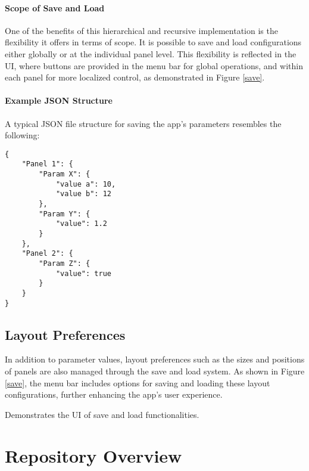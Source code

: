 \paragraph{Scope of Save and Load}
One of the benefits of this hierarchical and recursive implementation is the flexibility it offers in terms of scope. It is possible to save and load configurations either globally or at the individual panel level. This flexibility is reflected in the UI, where buttons are provided in the menu bar for global operations, and within each panel for more localized control, as demonstrated in Figure \ref{save}.

\paragraph{Example JSON Structure}
A typical JSON file structure for saving the app's parameters resembles the following:

\begin{verbatim}
{
    "Panel 1": {
        "Param X": {
            "value a": 10,
            "value b": 12
        },
        "Param Y": {
            "value": 1.2
        }
    },
    "Panel 2": {
        "Param Z": {
            "value": true
        }
    }
}
\end{verbatim}


\subsection{Layout Preferences}

In addition to parameter values, layout preferences such as the sizes and positions of panels are also managed through the save and load system. As shown in Figure \ref{save}, the menu bar includes options for saving and loading these layout configurations, further enhancing the app’s user experience.

{Demonstrates the UI of save and load functionalities.}

\section{Repository Overview}


